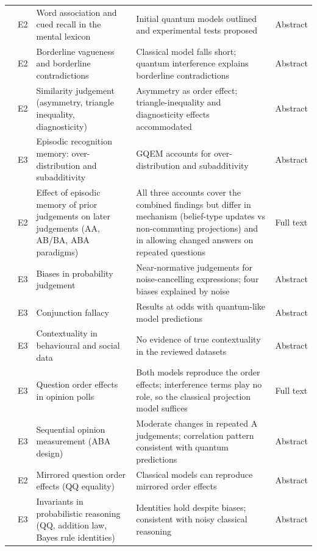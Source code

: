 \documentclass[10pt,a4paper]{article}
\begin{document}
\begin{longtable}{@{}P{3.6cm}P{0.7cm}P{4.6cm}P{6.2cm}P{1.1cm}@{}}
\citet{Bruza2009} & E2 & Word association and cued recall in the mental lexicon & Initial quantum models outlined and experimental tests proposed & Abstract \\
\citet{Blutner2013} & E2 & Borderline vagueness and borderline contradictions & Classical model falls short; quantum interference explains borderline contradictions & Abstract \\
\citet{Pothos2013b} & E2 & Similarity judgement (asymmetry, triangle inequality, diagnosticity) & Asymmetry as order effect; triangle-inequality and diagnosticity effects accommodated & Abstract \\
\citet{Trueblood2017b} & E3 & Episodic recognition memory: over-distribution and subadditivity & GQEM accounts for over-distribution and subadditivity & Abstract \\
\citet{Busemeyer2025} & E2 & Effect of episodic memory of prior judgements on later judgements (AA, AB/BA, ABA paradigms) & All three accounts cover the combined findings but differ in mechanism (belief-type updates vs non-commuting projections) and in allowing changed answers on repeated questions & Full text \\
\citet{Costello2014} & E3 & Biases in probability judgement & Near-normative judgements for noise-cancelling expressions; four biases explained by noise & Abstract \\
\citet{BoyerKassem2016} & E3 & Conjunction fallacy & Results at odds with quantum-like model predictions & Abstract \\
\citet{Dzhafarov2016b} & E3 & Contextuality in behavioural and social data & No evidence of true contextuality in the reviewed datasets & Abstract \\
\citet{Moreira2017b} & E3 & Question order effects in opinion polls & Both models reproduce the order effects; interference terms play no role, so the classical projection model suffices & Full text \\
\citet{Busemeyer2017b} & E3 & Sequential opinion measurement (ABA design) & Moderate changes in repeated A judgements; correlation pattern consistent with quantum predictions & Abstract \\
\citet{Kellen2018} & E2 & Mirrored question order effects (QQ equality) & Classical models can reproduce mirrored order effects & Abstract \\
\citet{Costello2018} & E3 & Invariants in probabilistic reasoning (QQ, addition law, Bayes rule identities) & Identities hold despite biases; consistent with noisy classical reasoning & Abstract \\

\end{longtable}
\end{document}
